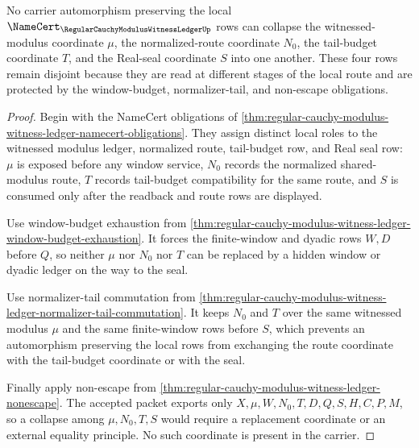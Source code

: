 \begin{theorem}
\label{thm:regular-cauchy-modulus-witness-ledger-carrier-disjointness}
No carrier automorphism preserving the local $\NameCert_{\RegularCauchyModulusWitnessLedgerUp}$ rows can collapse the witnessed-modulus coordinate $\mu$, the normalized-route coordinate $N_0$, the tail-budget coordinate $T$, and the Real-seal coordinate $S$ into one another. These four rows remain disjoint because they are read at different stages of the local route and are protected by the window-budget, normalizer-tail, and non-escape obligations.
\end{theorem}
\begin{proof}
Begin with the NameCert obligations of \autoref{thm:regular-cauchy-modulus-witness-ledger-namecert-obligations}. They assign distinct local roles to the witnessed modulus ledger, normalized route, tail-budget row, and Real seal row: $\mu$ is exposed before any window service, $N_0$ records the normalized shared-modulus route, $T$ records tail-budget compatibility for the same route, and $S$ is consumed only after the readback and route rows are displayed.

Use window-budget exhaustion from \autoref{thm:regular-cauchy-modulus-witness-ledger-window-budget-exhaustion}. It forces the finite-window and dyadic rows $W,D$ before $Q$, so neither $\mu$ nor $N_0$ nor $T$ can be replaced by a hidden window or dyadic ledger on the way to the seal.

Use normalizer-tail commutation from \autoref{thm:regular-cauchy-modulus-witness-ledger-normalizer-tail-commutation}. It keeps $N_0$ and $T$ over the same witnessed modulus $\mu$ and the same finite-window rows before $S$, which prevents an automorphism preserving the local rows from exchanging the route coordinate with the tail-budget coordinate or with the seal.

Finally apply non-escape from \autoref{thm:regular-cauchy-modulus-witness-ledger-nonescape}. The accepted packet exports only $X,\mu,W,N_0,T,D,Q,S,H,C,P,M$, so a collapse among $\mu,N_0,T,S$ would require a replacement coordinate or an external equality principle. No such coordinate is present in the carrier.
\end{proof}

